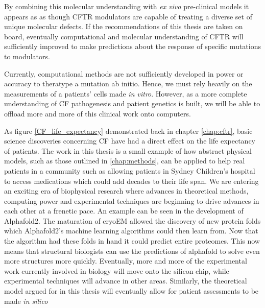 By combining this molecular understanding with \textit{ex vivo} pre-clinical models it appears as as though CFTR modulators are capable of treating a diverse set of unique molecular defects. If the recommendations of this thesis are taken on board, eventually computational and molecular understanding of CFTR will sufficiently improved to make predictions about the response of specific mutations to modulators.  

Currently, computational methods are not sufficiently developed in power or accuracy to theratype a mutation ab initio. Hence, we must rely heavily on the measurements of a patients' cells made \textit{in vitro}. However, as a more complete understanding of CF pathogenesis and patient genetics is built, we will be able to offload more and more of this clinical work onto computers.

As figure \ref{CF_life_expectancy} demonstrated back in chapter \ref{chap:cftr}, basic science discoveries concerning CF have had a direct effect on the life expectancy of patients. The work in this thesis is a small example of how abstract physical models, such as those outlined in \ref{chap:methods}, can be applied to help real patients in a community such as allowing patients in Sydney Children's hospital to access medications which could add decades to their life span. We are entering an exciting era of biophysical research where advances in theoretical methods, computing power and experimental techniques are beginning to drive advances in each other at a frenetic pace. An example can be seen in the development of Alphafold2. The maturation of cryoEM allowed the discovery of new protein folds which Alphafold2's machine learning algorithms could then learn from. Now that the algorithm had these folds in hand it could predict entire proteomes. This now means that structural biologists can use the predictions of alphafold to solve even more structures more quickly. Eventually, more and more of the experimental work currently involved in biology will move onto the silicon chip, while experimental techniques will advance in other areas. Similarly, the theoretical model argued for in this thesis will eventually allow for patient assessments to be made \textit{in silico}
